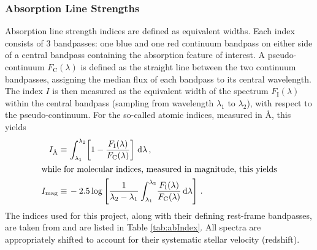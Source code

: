 	 	\subsubsection{Absorption Line Strengths}
	 		\label{subsubsec:Absorption}
	 		Absorption line strength indices are defined as equivalent widths. Each index consists of 3 bandpasses: one blue and one red continuum bandpass on either side of a central bandpass containing the absorption feature of interest. A pseudo-continuum $F_\mathrm{C}(\lambda)$ is defined as the straight line between the two continuum bandpasses, assigning the median flux of each bandpass to its central wavelength. The index $I$ is then measured as the equivalent width of the spectrum $F_\mathrm{I}(\lambda)$ within the central bandpass (sampling from wavelength $\lambda_1$ to $\lambda_2$), with respect to the pseudo-continuum. For the so-called atomic indices, measured in \AA, this yields
	 		\begin{align}
	 			I_\text{\AA} \equiv \, & \int^{\lambda_2}_{\lambda_1} \! \left[1 - \frac{F_\mathrm{I}(\lambda)}{F_\mathrm{C}(\lambda)}\right] \, \mathrm{d}\lambda \, , \\
	 		\intertext{while for molecular indices, measured in magnitude, this yields}
	 			I_\text{mag} \equiv \, & -2.5 \log\left[\frac{1}{\lambda_2 - \lambda_1} \int^{\lambda_2}_{\lambda_1} \! \frac{F_\mathrm{I}(\lambda)}{F_\mathrm{C}(\lambda)} \, \mathrm{d}\lambda\right] \, .
	 		\end{align}
	 		The indices used for this project, along with their defining rest-frame bandpasses, are taken from \citet{Trager1998} and are listed in Table \ref{tab:abIndex}. All spectra are appropriately shifted to account for their systematic stellar velocity (redshift). 

